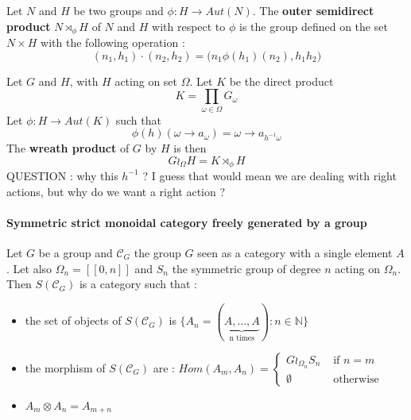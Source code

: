 \documentclass{report}
\begin{document}
\begin{defn}
    Let $N$ and $H$ be two groups and $\phi : H \rightarrow Aut(N)$.
    The  \textbf{outer semidirect product} $N\rtimes_\phi H$ of $N$ and $H$ with respect to $\phi$ is the group defined on the set $N\times H$ with the following operation :
    $$(n_1,h_1)\cdot (n_2,h_2) = \big(n_1\phi(h_1)(n_2),h_1h_2\big)$$
\end{defn}

\begin{defn}
    Let $G$ and $H$, with $H$ acting on set $\Omega$. Let $K$ be the direct product
    $$K = \prod_{\omega \in \Omega}G_\omega$$
    Let $\phi : H \rightarrow Aut(K)$ such that
    $$\phi(h)(\omega\rightarrow a_\omega) = \omega \rightarrow a_{h^{-1}\omega}$$
    The \textbf{wreath product} of $G$ by $H$ is then
    $$G\wr_\Omega H = K \rtimes_{\phi}H$$
    QUESTION : why this $h^{-1}$ ? I guess that would mean we are dealing with right actions, but why do we want a right action ?
\end{defn}

\paragraph{Symmetric strict monoidal category freely generated by a group}

\begin{prop}
    Let $G$ be a group and $\mathcal{C}_G$ the group $G$ seen as a category with a single element $A$. Let also $\Omega_n = [\![0,n]\!]$ and $S_n$ the symmetric group of degree $n$ acting on $\Omega_n$. Then $S(\mathcal{C}_G)$ is a category such that :
    \begin{itemize}
        \item the set of objects of $S(\mathcal{C}_G)$ is $\{A_n = (\underbrace{A,\dots,A}_\textrm{n times}) : n\in \mathbb{N}\}$
        \item the morphism of $S(\mathcal{C}_G)$ are : $Hom(A_m,A_n) = \begin{cases}
                      G\wr_{\Omega_n}S_n & \mbox{ if } n = m \\
                      \emptyset          & \mbox{ otherwise}
                  \end{cases}$
        \item $A_m\otimes A_n = A_{m+n}$
    \end{itemize}

\end{prop}
\end{document}
